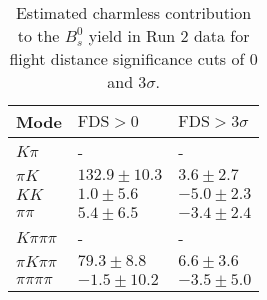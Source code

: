 \begin{table}[h]
  \centering
  \begin{tabular}{lll}
      \toprule
      Mode & $\mathrm{FDS} > 0$ & $\mathrm{FDS} > 3\sigma$ \\
      \midrule
      $K\pi$ & \-- & \-- \\
      $\pi K$ & $132.9 \pm 10.3$ & $3.6 \pm 2.7$ \\
      $KK$ & $1.0 \pm 5.6$ & $-5.0 \pm 2.3$ \\
      $\pi\pi$ & $5.4 \pm 6.5$ & $-3.4 \pm 2.4$ \\
      $K\pi\pi\pi$ & \-- & \-- \\
      $\pi K\pi\pi$ & $79.3 \pm 8.8$ & $6.6 \pm 3.6$ \\
      $\pi\pi\pi\pi$ & $-1.5 \pm 10.2$ & $-3.5 \pm 5.0$ \\
      \bottomrule
  \end{tabular}
  \caption{\small Estimated charmless contribution to the $B^{0}_{s}$ yield in Run 2 data for flight distance significance cuts of 0  and $3\sigma$.}
\label{tab:charmless_yields_Bs_run_2}
\end{table}
